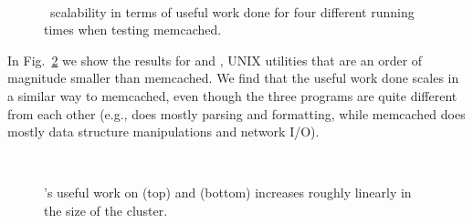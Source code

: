 \begin{figure}[t!]
  \centering
   \\
  \caption{\cnine\ scalability in terms of useful work done for four different running times when testing memcached.}
  \label{fig:scalab-memcached}
\end{figure}




In Fig.~\ref{fig:scalab} we show the results for  and , UNIX utilities that are an order of magnitude smaller than memcached. We find that the useful work done scales in a similar way to memcached, even though the three programs are quite different from each other (e.g.,  does mostly parsing and formatting, while memcached does mostly data structure manipulations and network I/O).


\begin{figure}[h!]
  \centering
   \\
  \caption{\cnine's useful work on  (top) and  (bottom) increases roughly linearly in the size of the cluster.}  
  \label{fig:scalab}
\end{figure}


